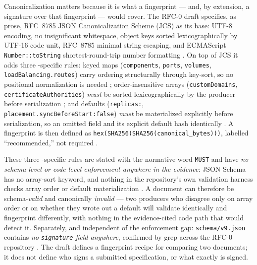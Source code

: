 Canonicalization matters because it is what a fingerprint — and, by extension, a signature
over that fingerprint — would cover. The RFC-0 draft specifies, as prose, RFC~8785 JSON
Canonicalization Scheme (JCS) as its base: UTF-8 encoding, no insignificant whitespace,
object keys sorted lexicographically by UTF-16 code unit, RFC~8785 minimal string escaping,
and ECMAScript \texttt{Number::\allowbreak{}to\allowbreak{}String} shortest-round-trip number formatting
. On top of JCS it adds three
-specific rules: keyed maps (\texttt{components}, \texttt{ports}, \texttt{volumes},
\texttt{loadBalancing.\allowbreak{}routes}) carry ordering structurally through key-sort, so no
positional normalization is needed ;
order-insensitive arrays (\texttt{customDomains}, \texttt{certificate\allowbreak{}Authorities})
\emph{must} be sorted lexicographically by the producer before serialization
; and defaults
(\texttt{replicas:}, \texttt{placement.syncBeforeStart:\allowbreak false})
\emph{must} be materialized explicitly before serialization, so an omitted field and its
explicit default hash identically .
A fingerprint is then defined as \texttt{hex(SHA256(SHA256(canonical\_bytes)))}, labelled
``recommended,'' not required .

These three -specific rules are stated with the normative word \texttt{MUST} and
have \emph{no schema-level or code-level enforcement anywhere in the evidence}: JSON Schema
has no array-sort keyword, and nothing in the repository's own validation harness checks
array order or default materialization
. A document can therefore be
schema-\emph{valid} and canonically \emph{invalid} — two producers who disagree only on
array order or on whether they wrote out a default will validate identically and fingerprint
differently, with nothing in the evidence-cited code path that would detect it. Separately,
and independent of the enforcement gap: \texttt{schema/v9.json} contains \emph{no
\texttt{signature} field anywhere}, confirmed by grep across the RFC-0 repository
. The draft defines a
fingerprint recipe for comparing two documents; it does not define who signs a submitted
 specification, or what exactly is signed.

